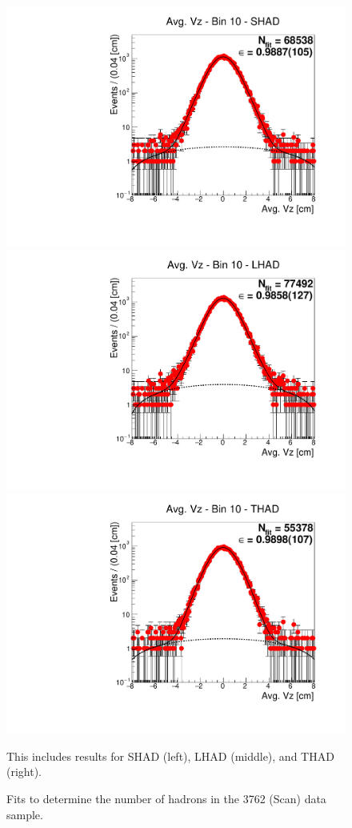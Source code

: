 \begin{figure}[H]
\centering
\includegraphics[scale=0.25]{figures/plots/nonDDbar_fit_results/scan/fit_scan_10_data_SHAD.pdf}
\hspace{-0.5cm}
\includegraphics[scale=0.25]{figures/plots/nonDDbar_fit_results/scan/fit_scan_10_data_LHAD.pdf}
\hspace{-0.5cm}
\includegraphics[scale=0.25]{figures/plots/nonDDbar_fit_results/scan/fit_scan_10_data_THAD.pdf}
\caption{Fits to determine the number of hadrons in the 3762 (Scan) data sample.}
{This includes results for SHAD (left), LHAD (middle), and THAD (right).}
\label{fig:hadron_fits_scan_10}
\end{figure}

